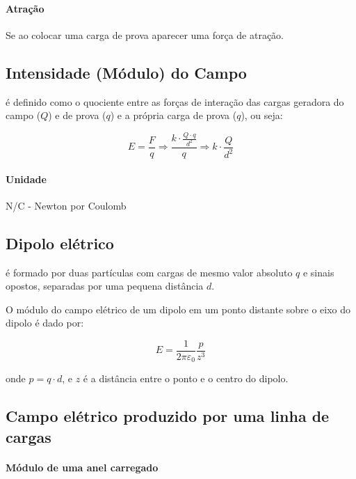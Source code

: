 \paragraph{Atração}\label{atrauxe7uxe3o}

Se ao colocar uma carga de prova aparecer uma força de atração.

\subsection{Intensidade (Módulo) do
Campo}\label{intensidade-muxf3dulo-do-campo}

é definido como o quociente entre as forças de interação das cargas
geradora do campo ($Q$) e de prova ($q$) e a própria carga de prova
($q$), ou seja:

\[
E = \frac{F}{q} \Rightarrow \frac{k \cdot \frac{Q \cdot q}{d^2}}{q}
  \Rightarrow k \cdot \frac{Q}{d^2}
\]

\paragraph{Unidade}\label{unidade}

N/C - Newton por Coulomb

\subsection{Dipolo elétrico}\label{dipolo-eluxe9trico}

é formado por duas partículas com cargas de mesmo valor absoluto $q$ e
sinais opostos, separadas por uma pequena distância $d$.

O módulo do campo elétrico de um dipolo em um ponto distante sobre o
eixo do dipolo é dado por:

\[
E = \frac{1}{2 \pi \varepsilon_0} \frac{p}{z^3}
\]

onde $p = q \cdot d$, e $z$ é a distância entre o ponto e o centro do
dipolo.

\subsection{Campo elétrico produzido por uma linha de
cargas}\label{campo-eluxe9trico-produzido-por-uma-linha-de-cargas}

\paragraph{Módulo de uma anel
carregado}\label{muxf3dulo-de-uma-anel-carregado}

